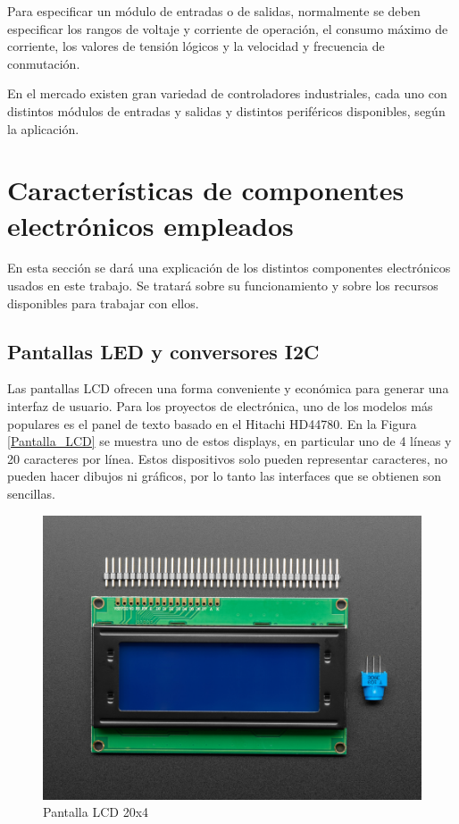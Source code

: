 Para especificar un módulo de entradas o de salidas, normalmente se deben especificar los rangos de voltaje y corriente de operación, el consumo máximo de corriente, los valores de tensión lógicos y la velocidad y frecuencia de conmutación.

En el mercado existen gran variedad de controladores industriales, cada uno con distintos módulos de entradas y salidas y distintos periféricos disponibles, según la aplicación. 

\section{Características de componentes electrónicos empleados}

En esta sección se dará una explicación de los distintos componentes electrónicos usados en este trabajo. Se tratará sobre su funcionamiento y sobre los recursos disponibles para trabajar con ellos.

\subsection{Pantallas LED y conversores I2C}

Las pantallas LCD ofrecen una forma conveniente y económica para generar una interfaz de usuario. Para los proyectos de electrónica, uno de los modelos más populares es el panel de texto basado en el Hitachi HD44780\citep{Arduino_Cookbook}. En la Figura \ref{Pantalla_LCD} se muestra uno de estos displays, en particular uno de 4 líneas y 20 caracteres por línea. Estos dispositivos solo pueden representar caracteres, no pueden hacer dibujos ni gráficos, por lo tanto las interfaces que se obtienen son sencillas.

\begin{figure}[htbp]
	\centering
	\includegraphics[scale=1]{./Figures/LCD.jpg}
	\caption{Pantalla LCD 20x4\protect\footnotemark}
	\label{fig:Pantalla_LCD}
\end{figure}

